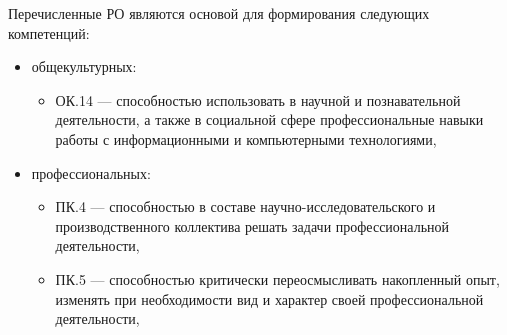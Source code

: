 {Перечисленные РО являются основой для формирования следующих компетенций:
\begin{itemize}
\item общекультурных: \begin{itemize}
\item ОК.14 — способностью использовать в научной и познавательной деятельности, а также в социальной сфере профессиональные навыки работы с информационными и компьютерными технологиями,
\end{itemize}\item профессиональных: \begin{itemize}
\item ПК.4 — способностью в составе научно-исследовательского и производственного коллектива решать задачи профессиональной деятельности,
\item ПК.5 — способностью критически переосмысливать накопленный опыт, изменять при необходимости вид и характер своей профессиональной деятельности,
\end{itemize}
\end{itemize}
}